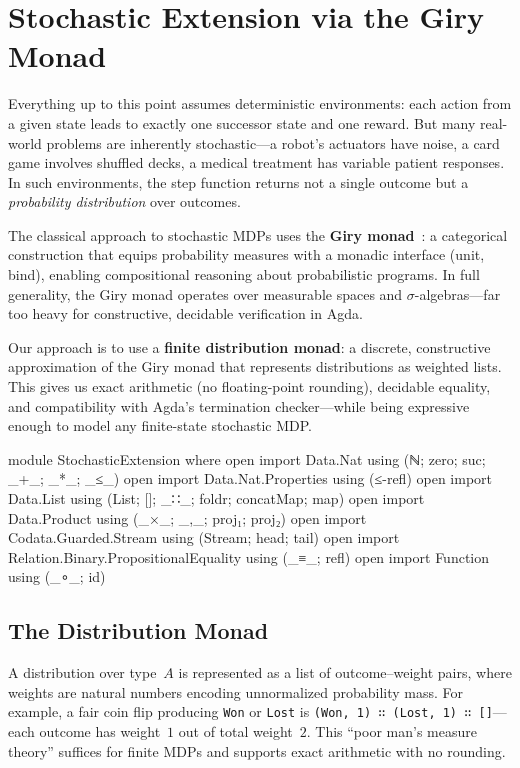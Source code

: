 \documentclass[9pt,a4paper]{article}
\theoremstyle{plain}
\theoremstyle{definition}
\theoremstyle{remark}
\begin{document}
\section{Stochastic Extension via the Giry Monad}\label{sec:stochastic}

Everything up to this point assumes deterministic environments: each action from a given state leads to exactly one successor state and one reward.  But many real-world problems are inherently stochastic---a robot's actuators have noise, a card game involves shuffled decks, a medical treatment has variable patient responses.  In such environments, the step function returns not a single outcome but a \emph{probability distribution} over outcomes.

The classical approach to stochastic MDPs uses the \textbf{Giry monad}~\cite{Giry1982}: a categorical construction that equips probability measures with a monadic interface (unit, bind), enabling compositional reasoning about probabilistic programs.  In full generality, the Giry monad operates over measurable spaces and $\sigma$-algebras---far too heavy for constructive, decidable verification in Agda.

Our approach is to use a \textbf{finite distribution monad}: a discrete, constructive approximation of the Giry monad that represents distributions as weighted lists.  This gives us exact arithmetic (no floating-point rounding), decidable equality, and compatibility with Agda's termination checker---while being expressive enough to model any finite-state stochastic MDP.

\begin{code}[hide]
module StochasticExtension where
  open import Data.Nat using (ℕ; zero; suc; _+_; _*_; _≤_)
  open import Data.Nat.Properties using (≤-refl)
  open import Data.List using (List; []; _∷_; foldr; concatMap; map)
  open import Data.Product using (_×_; _,_; proj₁; proj₂)
  open import Codata.Guarded.Stream using (Stream; head; tail)
  open import Relation.Binary.PropositionalEquality using (_≡_; refl)
  open import Function using (_∘_; id)
\end{code}

\subsection{The Distribution Monad}

A distribution over type~$A$ is represented as a list of outcome--weight pairs, where weights are natural numbers encoding unnormalized probability mass.  For example, a fair coin flip producing \texttt{Won} or \texttt{Lost} is \texttt{(Won,\,1)\,∷\,(Lost,\,1)\,∷\,[]}---each outcome has weight~$1$ out of total weight~$2$.  This ``poor man's measure theory'' suffices for finite MDPs and supports exact arithmetic with no rounding.
\end{document}
